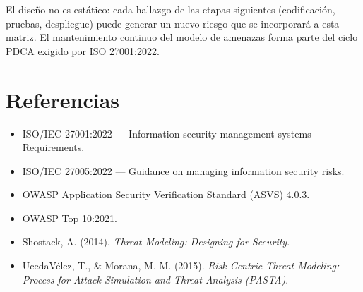 \documentclass[12pt,a4paper,oneside]{article}
\begin{document}
El diseño no es estático: cada hallazgo de las etapas siguientes (codificación, pruebas, despliegue) puede generar un nuevo riesgo que se incorporará a esta matriz. El mantenimiento continuo del modelo de amenazas forma parte del ciclo PDCA exigido por ISO 27001:2022.

\section*{Referencias}
\begin{itemize}[leftmargin=*]
  \item ISO/IEC 27001:2022 — Information security management systems — Requirements.
  \item ISO/IEC 27005:2022 — Guidance on managing information security risks.
  \item OWASP Application Security Verification Standard (ASVS) 4.0.3.
  \item OWASP Top 10:2021.
  \item Shostack, A. (2014). \textit{Threat Modeling: Designing for Security}.
  \item UcedaVélez, T., \& Morana, M. M. (2015). \textit{Risk Centric Threat Modeling: Process for Attack Simulation and Threat Analysis (PASTA)}.
\end{itemize}
\end{document}
